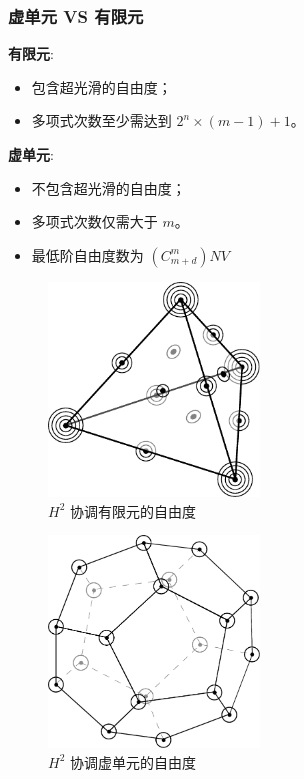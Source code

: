 \documentclass[notheorems,serif]{beamer}
\begin{document}
\begin{frame}
    \frametitle{虚单元 VS 有限元}
\begin{minipage}[b]{0.49\linewidth}
    \large{\textbf{有限元}}:
    \small
    \begin{itemize}
        \item 包含超光滑的自由度；
        \item 多项式次数至少需达到 $2^n \times (m-1) + 1$。
    \end{itemize}
\end{minipage}
\hfill
\begin{minipage}[b]{0.49\linewidth}
    \large{\textbf{虚单元}}:
    \small
    \begin{itemize}
        \item 不包含超光滑的自由度；
        \item 多项式次数仅需大于 $m$。
        \item 最低阶自由度数为 $(C_{m+d}^m)NV$
    \end{itemize}
\end{minipage}
\begin{minipage}[b]{0.49\linewidth}
    \begin{figure}[htpb]
        \centering
        \includegraphics[width=0.5\textwidth]{../figures/hmvem/smooth3d.pdf}
        \caption{$H^2$ 协调有限元的自由度}
    \end{figure}
\end{minipage}
\hfill
\begin{minipage}[b]{0.49\linewidth}
    \begin{figure}[htpb]
        \centering
        \includegraphics[width=0.5\textwidth]{../figures/hmvem/hmdof3d.pdf}
        \caption{$H^2$ 协调虚单元的自由度}
    \end{figure}
\end{minipage}
\end{frame}
\end{document}
